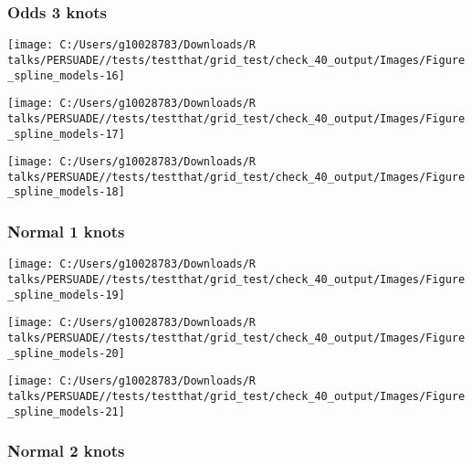 \documentclass[
]{article}
\begin{document}
\clearpage

\subsubsection{Odds 3 knots}\label{odds-3-knots}

\begin{flushleft}\texttt{[image: C:/Users/g10028783/Downloads/R talks/PERSUADE//tests/testthat/grid\_test/check\_40\_output/Images/Figure\_spline\_models-16]} \end{flushleft}

\begin{flushleft}\texttt{[image: C:/Users/g10028783/Downloads/R talks/PERSUADE//tests/testthat/grid\_test/check\_40\_output/Images/Figure\_spline\_models-17]} \end{flushleft}

\begin{flushleft}\texttt{[image: C:/Users/g10028783/Downloads/R talks/PERSUADE//tests/testthat/grid\_test/check\_40\_output/Images/Figure\_spline\_models-18]} \end{flushleft}

\clearpage

\subsubsection{Normal 1 knots}\label{normal-1-knots}

\begin{flushleft}\texttt{[image: C:/Users/g10028783/Downloads/R talks/PERSUADE//tests/testthat/grid\_test/check\_40\_output/Images/Figure\_spline\_models-19]} \end{flushleft}

\begin{flushleft}\texttt{[image: C:/Users/g10028783/Downloads/R talks/PERSUADE//tests/testthat/grid\_test/check\_40\_output/Images/Figure\_spline\_models-20]} \end{flushleft}

\begin{flushleft}\texttt{[image: C:/Users/g10028783/Downloads/R talks/PERSUADE//tests/testthat/grid\_test/check\_40\_output/Images/Figure\_spline\_models-21]} \end{flushleft}

\clearpage

\subsubsection{Normal 2 knots}\label{normal-2-knots}
\end{document}
